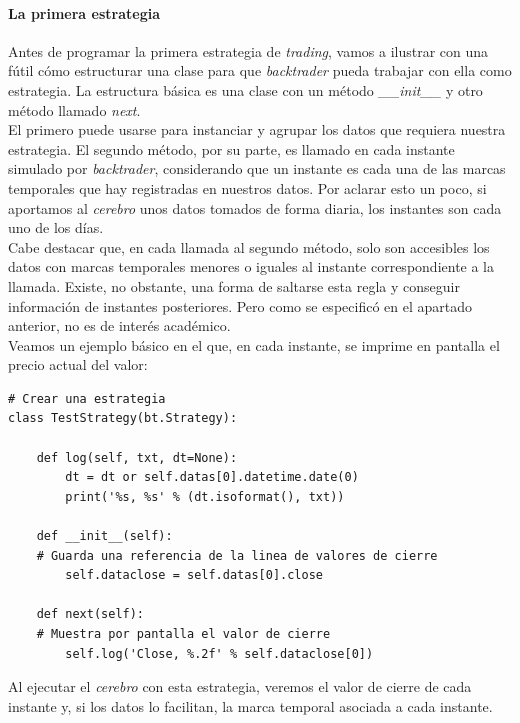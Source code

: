 		
		\paragraph{La primera estrategia}
		
		Antes de programar la primera estrategia de \textit{trading}, vamos a ilustrar con una f\'util c\'omo estructurar una clase para que \textit{backtrader} pueda trabajar con ella como estrategia. La estructura b\'asica es una clase con un m\'etodo \textit{\_\_init\_\_} y otro m\'etodo llamado \textit{next}. \\
		
		El primero puede usarse para instanciar y agrupar los datos que requiera nuestra estrategia. El segundo m\'etodo, por su parte, es llamado en cada instante simulado por \textit{backtrader}, considerando que un instante es cada una de las marcas temporales que hay registradas en nuestros datos. Por aclarar esto un poco, si aportamos al \textit{cerebro} unos datos tomados de forma diaria, los instantes son cada uno de los d\'ias. \\
		
		Cabe destacar que, en cada llamada al segundo m\'etodo, solo son accesibles los datos con marcas temporales menores o iguales al instante correspondiente a la llamada. Existe, no obstante, una forma de saltarse esta regla y conseguir informaci\'on de instantes posteriores. Pero como se especific\'o en el apartado anterior, no es de inter\'es acad\'emico.\\
		
		Veamos un ejemplo b\'asico en el que, en cada instante, se imprime en pantalla el precio actual del valor:\\
		
		\begin{lstlisting}[basicstyle=\tiny]
# Crear una estrategia
class TestStrategy(bt.Strategy):

	def log(self, txt, dt=None):
		dt = dt or self.datas[0].datetime.date(0)
		print('%s, %s' % (dt.isoformat(), txt))
	
	def __init__(self):
	# Guarda una referencia de la linea de valores de cierre
		self.dataclose = self.datas[0].close
	
	def next(self):
	# Muestra por pantalla el valor de cierre
		self.log('Close, %.2f' % self.dataclose[0])
		\end{lstlisting}
		
		Al ejecutar el \textit{cerebro} con esta estrategia, veremos el valor de cierre de cada instante y, si los datos lo facilitan, la marca temporal asociada a cada instante.\\
		
